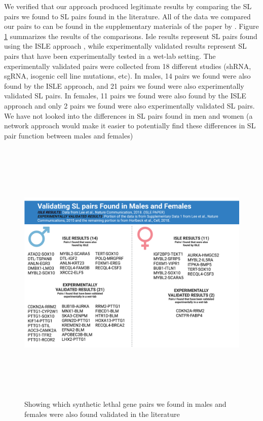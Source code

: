 \documentclass[10pt]{article}
\providecommand{\figref}[1]{Figure \ref{#1}}  %
\begin{document}
	We verified that our approach produced legitimate results by comparing the SL pairs we found to SL pairs found in the literature. All of the data we compared our pairs to can be found in the supplementary materials of the paper by \citet{cheng2021synthetic}. \figref{fig:10} summarizes the results of the comparisons. Isle results represent SL pairs found using the ISLE approach \citep{lee2018harnessing}, while experimentally validated results represent SL pairs that have been experimentally tested in a wet-lab setting. The experimentally validated pairs were collected from 18 different studies (shRNA, sgRNA, isogenic cell line mutations, etc). In males, 14 pairs we found were also found by the ISLE approach, and 21 pairs we found were also experimentally validated SL pairs. In females, 11 pairs we found were also found by the ISLE approach and only 2 pairs we found were also experimentally validated SL pairs. We have not looked into the differences in SL pairs found in men and women (a network approach would make it easier to potentially find these differences in SL pair function between males and females)
	
	\begin{figure}[!h]
		\centering
		\includegraphics[width=\textwidth, height=13cm]{validating_syntheticlethal_pairs.png}
		\caption{Showing which synthetic lethal gene pairs we found in males and females were also found validated in the literature}
		\label{fig:10}
	\end{figure}
\end{document}
